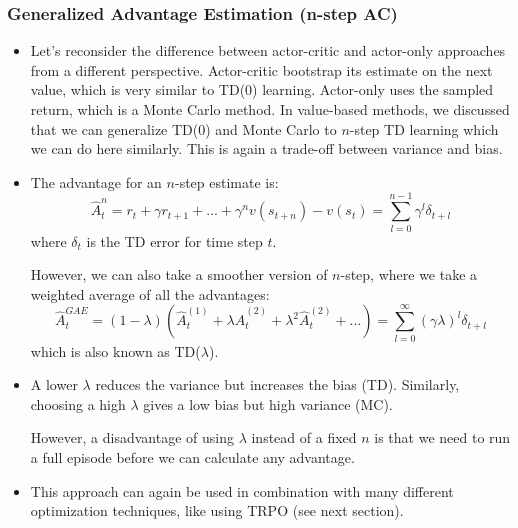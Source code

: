 \subsubsection{Generalized Advantage Estimation (n-step AC)}
\begin{itemize}
	\item Let's reconsider the difference between actor-critic and actor-only approaches from a different perspective. Actor-critic bootstrap its estimate on the next value, which is very similar to TD(0) learning. Actor-only uses the sampled return, which is a Monte Carlo method. In value-based methods, we discussed that we can generalize TD(0) and Monte Carlo to $n$-step TD learning which we can do here similarly. This is again a trade-off between variance and bias. %
	\item The advantage for an $n$-step estimate is:
	$$\hat{A}_t^n = r_t + \gamma r_{t+1} + ... + \gamma^n v(s_{t+n}) - v(s_t) = \sum_{l=0}^{n-1} \gamma^{l}\delta_{t+l}$$
	where $\delta_{t}$ is the TD error for time step $t$.
	 
	However, we can also take a smoother version of $n$-step, where we take a weighted average of all the advantages:
	$$\hat{A}_t^{GAE} = (1-\lambda)\left(\hat{A}_t^{(1)} + \lambda \hat{A}_t^{(2)} + \lambda^2 \hat{A}_t^{(2)} + ...\right) = \sum_{l=0}^{\infty} (\gamma \lambda)^{l}\delta_{t+l}$$
	which is also known as TD($\lambda$).
	\item A lower $\lambda$ reduces the variance but increases the bias (TD). Similarly, choosing a high $\lambda$ gives a low bias but high variance (MC).
	
	However, a disadvantage of using $\lambda$ instead of a fixed $n$ is that we need to run a full episode before we can calculate any advantage.
	\item This approach can again be used in combination with many different optimization techniques, like using TRPO (see next section). 
\end{itemize}
